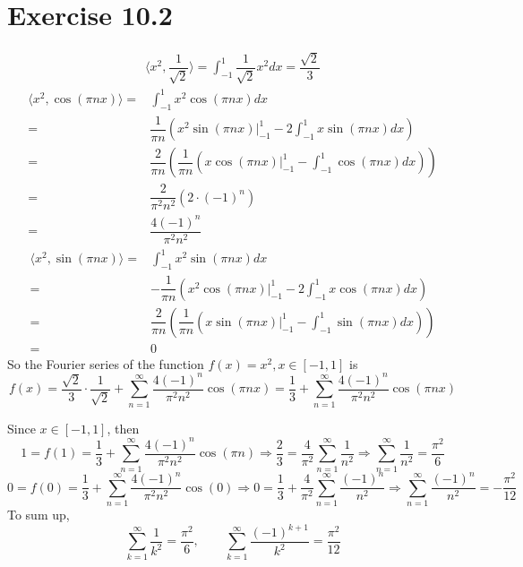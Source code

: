 \documentclass[a4paper,12pt,titlepage]{article}
\begin{document}
\section*{Exercise 10.2}
\begin{align*}
\langle x^2,\dfrac{1}{\sqrt{2}}\rangle=\int_{-1}^1\dfrac{1}{\sqrt{2}}x^2dx=\dfrac{\sqrt{2}}{3}
\end{align*}
\begin{align*}
\langle x^2,\cos(\pi nx)\rangle=&\int_{-1}^1x^2\cos(\pi nx)dx\\
=&\dfrac{1}{\pi n}(x^2\sin(\pi nx)|_{-1}^1-2\int_{-1}^1x\sin(\pi nx)dx)\\
=&\dfrac{2}{\pi n}(\dfrac{1}{\pi n}(x\cos(\pi nx)|_{-1}^1-\int_{-1}^1\cos(\pi nx)dx))\\
=&\dfrac{2}{\pi^2n^2}(2\cdot(-1)^{n})\\
=&\dfrac{4(-1)^n}{\pi^2n^2}
\end{align*}
\begin{align*}
\langle x^2,\sin(\pi nx)\rangle=&\int_{-1}^1x^2\sin(\pi nx)dx\\
=&-\dfrac{1}{\pi n}(x^2\cos(\pi nx)|_{-1}^1-2\int_{-1}^1x\cos(\pi nx)dx)\\
=&\dfrac{2}{\pi n}(\dfrac{1}{\pi n}(x\sin(\pi nx)|_{-1}^1-\int_{-1}^1\sin(\pi nx)dx))\\
=&0
\end{align*}
So the Fourier series of the function $f(x)=x^2,x\in[-1,1]$ is
$$f(x)=\dfrac{\sqrt{2}}{3}\cdot\dfrac{1}{\sqrt{2}}+\sum\limits_{n=1}^{\infty}\dfrac{4(-1)^n}{\pi^2n^2}\cos(\pi nx)=\dfrac{1}{3}+\sum\limits_{n=1}^{\infty}\dfrac{4(-1)^n}{\pi^2n^2}\cos(\pi nx)$$

Since $x\in[-1,1]$, then
$$1=f(1)=\dfrac{1}{3}+\sum\limits_{n=1}^{\infty}\dfrac{4(-1)^n}{\pi^2n^2}\cos(\pi n)\Rightarrow \dfrac{2}{3}=\dfrac{4}{\pi^2}\sum\limits_{n=1}^{\infty}\dfrac{1}{n^2}\Rightarrow \sum\limits_{n=1}^{\infty}\dfrac{1}{n^2}=\dfrac{\pi^2}{6}$$
$$0=f(0)=\dfrac{1}{3}+\sum\limits_{n=1}^{\infty}\dfrac{4(-1)^n}{\pi^2n^2}\cos(0)\Rightarrow 0=\dfrac{1}{3}+\dfrac{4}{\pi^2}\sum\limits_{n=1}^{\infty}\dfrac{(-1)^n}{n^2}\Rightarrow \sum\limits_{n=1}^{\infty}\dfrac{(-1)^n}{n^2}=-\dfrac{\pi^2}{12}$$
To sum up,
$$\sum\limits_{k=1}^{\infty}\dfrac{1}{k^2}=\dfrac{\pi^2}{6},\quad\quad\sum\limits_{k=1}^{\infty}\dfrac{(-1)^{k+1}}{k^2}=\dfrac{\pi^2}{12}$$
\end{document}

